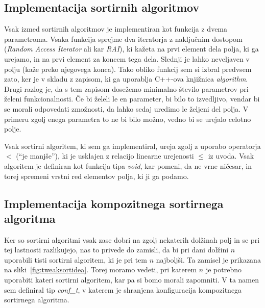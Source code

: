 \documentclass[a4paper,oneside,12pt]{article}
\begin{document}
\subsection{Implementacija sortirnih algoritmov}
\label{chapter:sortimplementation}
Vsak izmed sortirnih algoritmov je implementiran kot funkcija z dvema parametroma.
Vsaka funkcija sprejme dva iteratorja z naključnim dostopom (\emph{Random Access
Iterator} ali kar \emph{RAI}),
ki kažeta na prvi element dela polja, ki ga urejamo, in na prvi element za koncem tega dela.
Slednji je lahko neveljaven v polju (kaže preko njegovega konca).
Tako obliko funkcij sem si izbral predvsem zato, ker je v skladu z zapisom, ki ga uporablja
C++-ova knjižnica \emph{algorithm}. Drugi razlog je, da s tem zapisom dosežemo minimalno število
parametrov pri želeni funkcionalnosti. Če bi želeli le en parameter, bi bilo to
izvedljivo, vendar bi se morali odpovedati zmožnosti, da lahko sedaj uredimo le željeni
del polja. V primeru zgolj enega parametra to ne bi bilo možno, vedno bi se
urejalo celotno polje.

Vsak sortirni algoritem, ki sem ga implementiral, ureja zgolj z uporabo operatorja $<$
(``je manjše''), ki je usklajen z relacijo linearne urejenosti $\leq$ iz uvoda. Vsak
algoritem je definiran kot funkcija tipa \emph{void}, kar pomeni, da ne vrne ničesar, in
torej spremeni vrstni red elementov polja, ki ji ga podamo.

\subsection{Implementacija kompozitnega sortirnega algoritma}
\label{chapter:tweaksort}
Ker so sortirni algoritmi vsak zase dobri na zgolj nekaterih dolžinah polj in se pri tej
lastnosti razlikujejo, nas to privede do zamisli, da bi pri dani dolžini $n$ uporabili tisti
sortirni algoritem, ki je pri tem $n$ najboljši. Ta zamisel je prikazana na sliki~\ref{fig:tweaksortidea}.
Torej moramo vedeti, pri katerem $n$ je
potrebno uporabiti kateri sortirni algoritem, kar pa si bomo morali zapomniti. V ta
namen sem definiral tip \emph{conf\_\!t}, v katerem je shranjena konfiguracija kompozitnega
sortirnega algoritma. 
\end{document}
